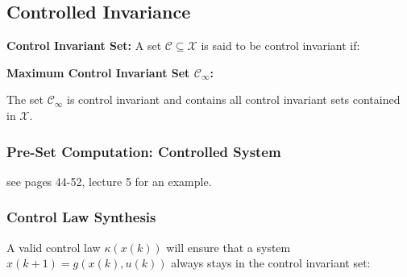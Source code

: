 \documentclass[8pt,a4paper]{scrartcl}
\begin{document}
\begin{multicols*}{3}

\subsection{Controlled Invariance}

\textbf{Control Invariant Set:} A set $\mathcal{C}\subseteq\mathcal{X}$ is said to be control invariant if:


\textbf{Maximum Control Invariant Set $\mathcal{C}_\infty$:}

The set $\mathcal{C}_\infty$ is control invariant and contains all control invariant sets contained in $\mathcal{X}$.


\subsubsection{Pre-Set Computation: Controlled System}



see pages 44-52, lecture 5 for an example.

\subsubsection{Control Law Synthesis}

A valid control law $\kappa(x(k))$ will ensure that a system $x(k+1) = g(x(k),u(k))$ always stays in the control invariant set:


\end{multicols*}
\end{document}
